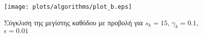 \begin{figure}[htbp]
	\centerfloat
	\texttt{[image: plots/algorithms/plot\_b.eps]}
	\caption{Σύγκλιση της μεγίστης καθόδου με προβολή για $s_k = 15$, $\gamma_k = 0.1$, $\epsilon = 0.01$}
\end{figure}

